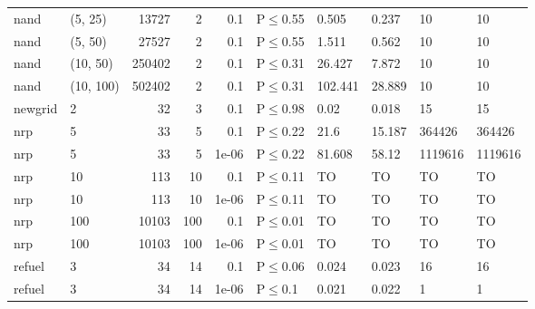 \begin{longtable}{llrrrlllll}
 nand          & (5, 25)   &  	13727 &   2 & 0.1   & P$\leq$0.55  & 0.505   & 0.237  & 10      & 10      \\
 nand          & (5, 50)   &  	27527 &   2 & 0.1   & P$\leq$0.55  & 1.511   & 0.562  & 10      & 10      \\
 nand          & (10, 50)  & 	250402 &   2 & 0.1   & P$\leq$0.31  & 26.427  & 7.872  & 10      & 10      \\
 nand          & (10, 100) & 	502402 &   2 & 0.1   & P$\leq$0.31  & 102.441 & 28.889 & 10      & 10      \\
 newgrid       & 2         &     	32 &   3 & 0.1   & P$\leq$0.98  & 0.02    & 0.018  & 15      & 15      \\
 nrp           & 5         &     	33 &   5 & 0.1   & P$\leq$0.22  & 21.6    & 15.187 & 364426  & 364426  \\
 nrp           & 5         &     	33 &   5 & 1e-06 & P$\leq$0.22  & 81.608  & 58.12  & 1119616 & 1119616 \\
 nrp           & 10        &    	113 &  10 & 0.1   & P$\leq$0.11  & TO      & TO     & TO      & TO      \\
 nrp           & 10        &    	113 &  10 & 1e-06 & P$\leq$0.11  & TO      & TO     & TO      & TO      \\
 nrp           & 100       &  	10103 & 100 & 0.1   & P$\leq$0.01  & TO      & TO     & TO      & TO      \\
 nrp           & 100       &  	10103 & 100 & 1e-06 & P$\leq$0.01  & TO      & TO     & TO      & TO      \\
 refuel        & 3         &     	34 &  14 & 0.1   & P$\leq$0.06  & 0.024   & 0.023  & 16      & 16      \\
 refuel        & 3         &     	34 &  14 & 1e-06 & P$\leq$0.1   & 0.021   & 0.022  & 1       & 1       \\
\bottomrule
\end{longtable}
